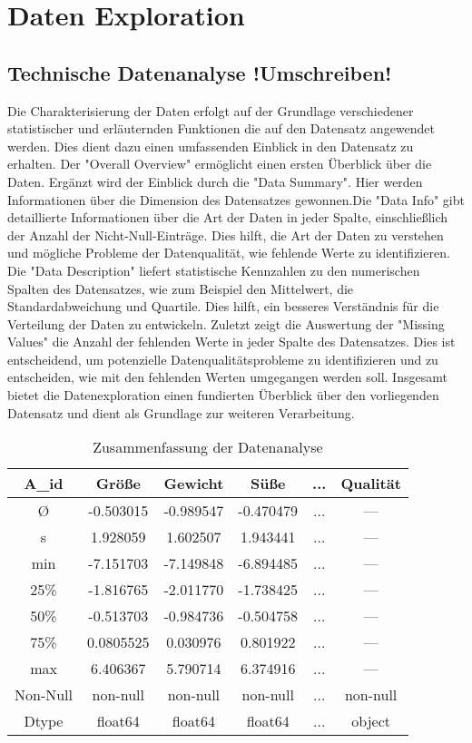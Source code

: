 \documentclass{article}
\begin{document}
\section{Daten Exploration}


\subsection{Technische Datenanalyse !Umschreiben!}
Die Charakterisierung der Daten erfolgt auf der Grundlage verschiedener statistischer und erläuternden Funktionen die auf den Datensatz angewendet werden. Dies dient dazu einen umfassenden Einblick in den Datensatz zu erhalten. Der "Overall Overview" ermöglicht einen ersten Überblick über die Daten. Ergänzt wird der Einblick durch die "Data Summary". Hier werden Informationen über die Dimension des Datensatzes gewonnen.Die "Data Info" gibt detaillierte Informationen über die Art der Daten in jeder Spalte, einschließlich der Anzahl der Nicht-Null-Einträge. Dies hilft, die Art der Daten zu verstehen und mögliche Probleme der Datenqualität, wie fehlende Werte zu identifizieren. Die "Data Description" liefert statistische Kennzahlen zu den numerischen Spalten des Datensatzes, wie zum Beispiel den Mittelwert, die Standardabweichung und Quartile. Dies hilft, ein besseres Verständnis für die
Verteilung der Daten zu entwickeln. Zuletzt zeigt die Auswertung der "Missing Values" die Anzahl der fehlenden Werte in jeder Spalte des Datensatzes. Dies ist entscheidend, um potenzielle Datenqualitätsprobleme zu identifizieren und zu entscheiden, wie mit den fehlenden Werten umgegangen werden soll. Insgesamt bietet die Datenexploration einen fundierten Überblick über den vorliegenden Datensatz und dient als Grundlage zur weiteren Verarbeitung.\\
\begin{table}[h]
\centering
\begin{tabular}{|c|c|c|c|c|c|}
\hline
\textbf{A\_id} & \textbf{Größe} & \textbf{Gewicht} & \textbf{Süße} & \textbf{...} & \textbf{Qualität} \\
\hline
\O & -0.503015 & -0.989547 & -0.470479 & ... & ---\\
s & 1.928059 & 1.602507 & 1.943441 & ... & --- \\
min & -7.151703 & -7.149848 & -6.894485 & ... & --- \\
25\% & -1.816765 & -2.011770 & -1.738425 & ... & --- \\
50\% & -0.513703 & -0.984736 & -0.504758 & ... & --- \\
75\% & 0.0805525 & 0.030976 & 0.801922 & ... & --- \\
max & 6.406367 & 5.790714 & 6.374916 & ... & --- \\
Non-Null & non-null & non-null & non-null & ... & non-null \\
Dtype & float64 & float64 & float64 & ... & object \\
\hline
\end{tabular}
\caption{Zusammenfassung der Datenanalyse}
\end{table}
\end{document}
